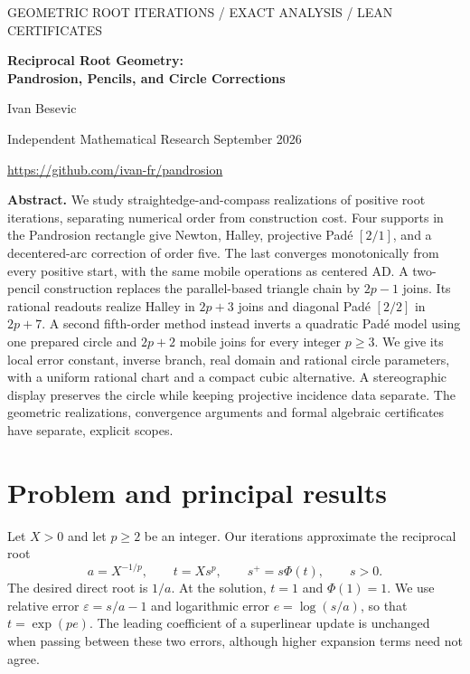 \documentclass[11pt,a4paper]{article}
\theoremstyle{remark}\newtheorem{remark}[theorem]{Remark}
\begin{document}
\raggedbottom
\thispagestyle{empty}
{\small\sffamily\color{blue} GEOMETRIC ROOT ITERATIONS / EXACT ANALYSIS / LEAN CERTIFICATES}\par
\vspace{7pt}
{\LARGE\bfseries\color{ink} Reciprocal Root Geometry:\\Pandrosion, Pencils, and Circle Corrections\par}
\vspace{8pt}
{\large Ivan Besevic}\par
{\small Independent Mathematical Research\quad\textbullet{} September 2026}\par
{\small\url{https://github.com/ivan-fr/pandrosion}}\par
\vspace{10pt}
\textbf{Abstract.}
We study straightedge-and-compass realizations of positive root iterations, separating numerical order from construction cost. Four supports in the Pandrosion rectangle give Newton, Halley, projective Pad\'e $[2/1]$, and a decentered-arc correction of order five. The last converges monotonically from every positive start, with the same mobile operations as centered AD. A two-pencil construction replaces the parallel-based triangle chain by $2p-1$ joins. Its rational readouts realize Halley in $2p+3$ joins and diagonal Pad\'e $[2/2]$ in $2p+7$. A second fifth-order method instead inverts a quadratic Pad\'e model using one prepared circle and $2p+2$ mobile joins for every integer $p\ge3$. We give its local error constant, inverse branch, real domain and rational circle parameters, with a uniform rational chart and a compact cubic alternative. A stereographic display preserves the circle while keeping projective incidence data separate. The geometric realizations, convergence arguments and formal algebraic certificates have separate, explicit scopes.

\section{Problem and principal results}
Let $X>0$ and let $p\ge2$ be an integer. Our iterations approximate the reciprocal root
\begin{equation}\label{eq:state}
 a=X^{-1/p},\qquad t=Xs^p,\qquad s^+=s\Phi(t),\qquad s>0.
\end{equation}
The desired direct root is $1/a$. At the solution, $t=1$ and $\Phi(1)=1$. We use relative error $\varepsilon=s/a-1$ and logarithmic error $e=\log(s/a)$, so that $t=\exp(pe)$. The leading coefficient of a superlinear update is unchanged when passing between these two errors, although higher expansion terms need not agree.
\end{document}
